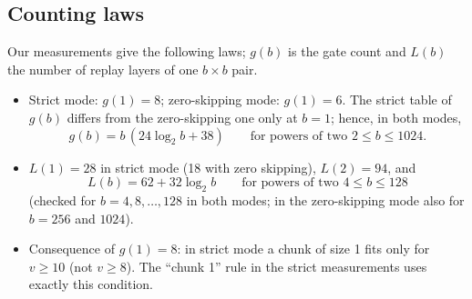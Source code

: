 \documentclass[11pt]{article}
\theoremstyle{plain}
\begin{document}
\subsection{Counting laws}\label{sec:counting}
Our measurements give the following laws; $g(b)$ is the gate count and $L(b)$ the number of replay layers of one $b\times b$ pair.
\begin{itemize}
\item Strict mode: $g(1)=8$; zero-skipping mode: $g(1)=6$. The strict table of $g(b)$ differs from the zero-skipping one only at $b=1$; hence, in both modes,
\begin{equation}\label{eq:gb}
g(b)=b\,(24\log_2 b+38)\qquad\text{for powers of two } 2\le b\le1024.
\end{equation}
\item $L(1)=28$ in strict mode (18 with zero skipping), $L(2)=94$, and
\begin{equation}\label{eq:Lb}
L(b)=62+32\log_2 b\qquad\text{for powers of two } 4\le b\le128
\end{equation}
(checked for $b=4,8,\dots,128$ in both modes; in the zero-skipping mode also for $b=256$ and $1024$).
\item Consequence of $g(1)=8$: in strict mode a chunk of size 1 fits only for $v\ge10$ (not $v\ge8$). The ``chunk 1'' rule in the strict measurements uses exactly this condition.
\end{itemize}
\end{document}
